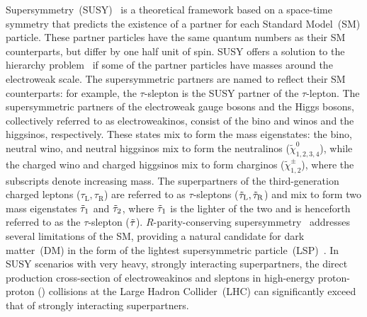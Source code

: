 Supersymmetry~(SUSY)~\cite{Golfand:1971iw,Volkov:1973ix,Wess:1974tw,Wess:1974jb,Ferrara:1974pu,Salam:1974ig} is a theoretical framework based on a space-time symmetry that predicts the existence of 
a partner for each Standard Model~(SM) particle. These partner particles have the same quantum numbers as their SM counterparts, but differ by one half unit of spin. SUSY offers a solution to the hierarchy problem~\cite{Sakai:1981gr,Dimopoulos:1981yj,Ibanez:1981yh,Dimopoulos:1981zb} if some of the partner particles have masses around the electroweak scale. 
The supersymmetric partners are named to reflect their SM counterparts: for example, the $\tau$-slepton is the SUSY partner of the $\tau$-lepton. 
The supersymmetric partners of the electroweak gauge bosons and the Higgs bosons, collectively referred to as electroweakinos, consist of the bino and winos and the higgsinos, respectively.
These states mix to form the mass eigenstates: 
the bino, neutral wino, and neutral higgsinos mix to form the neutralinos ($\tilde{\chi}_{1,2,3,4}^{0}$), while the charged wino and charged higgsinos mix to form charginos ($\tilde{\chi}_{1,2}^{\pm}$), where the subscripts denote increasing mass.
The superpartners of the third-generation charged leptons ($\tau_{\mathrm{L}}, \tau_{\mathrm{R}}$) are referred to as $\tau$-sleptons ($\tilde{\tau}_{\mathrm{L}}, \tilde{\tau}_{\mathrm{R}}$) and mix to form two mass eigenstates $\tilde{\tau}_{1}$ and $\tilde{\tau}_{2}$, where $\tilde{\tau}_{1}$ is the lighter of the two and is henceforth referred to as the $\tau$-slepton ($\tilde{\tau}$).
 $R$-parity-conserving supersymmetry~\cite{Farrar:1978xj} addresses several limitations of the SM, providing a natural candidate for dark matter~(DM) in the form of the lightest supersymmetric particle~(LSP)~\cite{Goldberg:1983nd,Ellis:1983ew}. 
 In SUSY scenarios with very heavy, strongly interacting superpartners, the direct production cross-section of electroweakinos and sleptons in high-energy proton-proton (\pp) collisions at the Large Hadron Collider~(LHC) can significantly exceed that of strongly interacting superpartners. 

